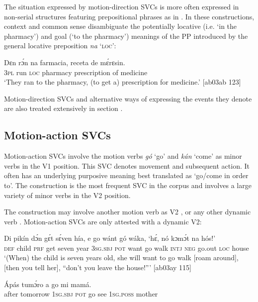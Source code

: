The situation expressed by motion-direction SVCs is more often expressed in non-serial structures featuring prepositional phrases as in . In these constructions, context and common sense disambiguate the potentially locative (i.e. ‘in the pharmacy’) and goal (‘to the pharmacy’) meanings of the PP introduced by the general locative preposition \textit{na} ‘\textsc{loc}’:


\ea%
    \label{ex:key:1549}
    \gll Dɛn  rɔ́n    na  farmacia,  receta    de  mɛ́rɛsin.\\
\textsc{3pl}  run    \textsc{loc}  pharmacy  prescription  of  medicine\\

\glt ‘They ran to the pharmacy, (to get a) prescription for medicine.’ [ab03ab 123]
\z

Motion-direction SVCs and alternative ways of expressing the events they denote are also treated extensively in section .

\subsection{Motion-action SVCs}

Motion-action SVCs involve the motion verbs \textit{gó} ‘go’ and \textit{kán} ‘come’ as minor verbs in the V1 position. This SVC denotes movement and subsequent action. It often has an underlying purposive meaning best translated as ‘go/come in order to’. The construction is the most frequent SVC in the corpus and involves a large variety of minor verbs in the V2 position.


The construction may involve another motion verb as V2 , or any other dynamic verb . Motion-action SVCs are only attested with a dynamic V2:



\ea%
    \label{ex:key:1550}
    \gll Di  pikín  dɔ́n  gɛ́t  sɛ́ven  hía,    e    go  wánt  gó  wáka,
‘hɛ́,  nó  kɔmɔ́t  na  hós!’\\
\textsc{def}  child  \textsc{prf}  get  seven  year    \textsc{3sg.sbj}  \textsc{pot}  want  go  walk
\textsc{intj}  \textsc{neg}  go.out  \textsc{loc}  house\\
\glt ‘(When) the child is seven years old, she will want to go walk [roam around], 
[then you tell her], “don’t you leave the house!”’ [ab03ay 115]
\z


\ea%
    \label{ex:key:1551}
    \gll \'{A}pás  tumɔ́ro    a    go      mi    mamá.\\
after  tomorrow  \textsc{1sg.sbj}  \textsc{pot}  go  see  \textsc{1sg.poss}  mother\\

